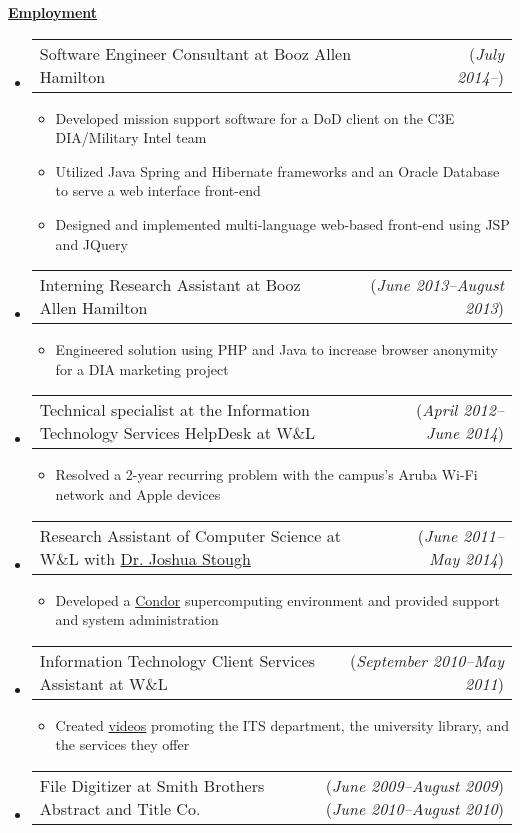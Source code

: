 \documentclass[11pt, letterpaper]{letter}
\makeatletter
\newlength{\indwidth}				\setlength{\indwidth}{\textwidth-.4in}
\newlength{\listSpacing}			\setlength{\listSpacing}{.0375in}
\newlength{\headerAntispace}		\setlength{\headerAntispace}{-6pt}
\newlength{\subListAntispace}		\setlength{\subListAntispace}{-.25in}
\newlength{\subListMidAntispace}	\setlength{\subListMidAntispace}{-2.5pt}
\newlength{\subListEndAntispace}	\setlength{\subListEndAntispace}{-.075in}
\newcommand{\lst}[1]{\vspace{\subListAntispace}\begin{itemize} \item #1 \end{itemize}\vspace{\subListEndAntispace}}
\newcommand{\dated}[2]{
	\begin{tabular*}{\indwidth}{l@{\extracolsep{\fill}}r}#1 & (\textit{#2})\end{tabular*}}
\newcommand{\datedTwo}[3]{
	\begin{tabular*}{\indwidth}{l@{\extracolsep{\fill}}r}#1 & (\textit{#2}) (\textit{#3})\end{tabular*}}
\newcommand \myul[3]{%
	\begingroup%
	\renewcommand \ULdepth {#1}%
	\renewcommand \ULthickness {#2}%
	\uline{#3}%
	\endgroup%
}
\newcommand \sectionheader[1]{
	\myul{2.7pt}{0.5pt}{\large \textbf{#1}}
}
\makeatother
\begin{document}
\sectionheader{Employment}
\vspace{\headerAntispace}
\begin{itemize}
	\setlength{\itemsep}{\listSpacing}
	\item \dated{Software Engineer Consultant at Booz Allen Hamilton}{July 2014--}
	\lst{
		Developed mission support software for a DoD client on the C3E DIA/Military Intel team
		\vspace{\subListMidAntispace}
		\item Utilized Java Spring and Hibernate frameworks and an Oracle Database to serve a web
		      interface front-end
		\vspace{\subListMidAntispace}
		\item Designed and implemented multi-language web-based front-end using JSP and JQuery
	}
	\item \dated{Interning Research Assistant at Booz Allen Hamilton}{June 2013--August 2013}
		\lst{Engineered solution using PHP and Java to increase browser anonymity for a DIA
		     marketing project}
	\item \dated{Technical specialist at the Information Technology Services HelpDesk at W\&L}
	            {April 2012--June 2014}
		\lst{Resolved a 2-year recurring problem with the campus's Aruba Wi-Fi network and Apple devices}
	\item \dated{Research Assistant of Computer Science at W\&L with 
	             \href{http://cs.wlu.edu/~stough/}{Dr. Joshua Stough}}
	            {June 2011--May 2014}
		\lst{Developed a \href{http://www.htcondorproject.org/}{Condor} supercomputing environment and provided support and system administration
		}
	\item \dated{Information Technology Client Services Assistant at W\&L}{September 2010--May 2011}
		\lst{Created \href{http://youtu.be/NvOarFOmly0?hd=1}{videos} promoting the ITS department,
		     the university library, and the services they offer
		}
	\item \datedTwo{File Digitizer at Smith Brothers Abstract and Title Co.}
	               {June 2009--August 2009}{June 2010--August 2010}
\end{itemize}
\end{document}
